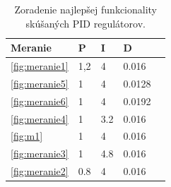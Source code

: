 \documentclass{article}
\begin{document}
\begin{table}[!htbp]
	\begin{center}
		\begin{tabular}[c]{|l|l|l|l|l|}
			\hline
			Meranie & P & I & D \\
			\hline
			\ref{fig:meranie1} & 1,2 & 4 & 0.016 \\
			\ref{fig:meranie5} & 1 & 4 & 0.0128  \\
			\ref{fig:meranie6} & 1 & 4 & 0.0192 \\
			\ref{fig:meranie4} & 1 & 3.2 & 0.016 \\
			\ref{fig:m1} & 1 & 4 & 0.016 \\
			\ref{fig:meranie3} & 1 & 4.8 & 0.016 \\
			\ref{fig:meranie2} & 0.8 & 4 & 0.016 \\
			\hline
		\end{tabular}
	\end{center}
	\caption{Zoradenie najlepšej funkcionality skúšaných PID regulátorov.}
	\label{tab:zaver}
\end{table}
\end{document}
